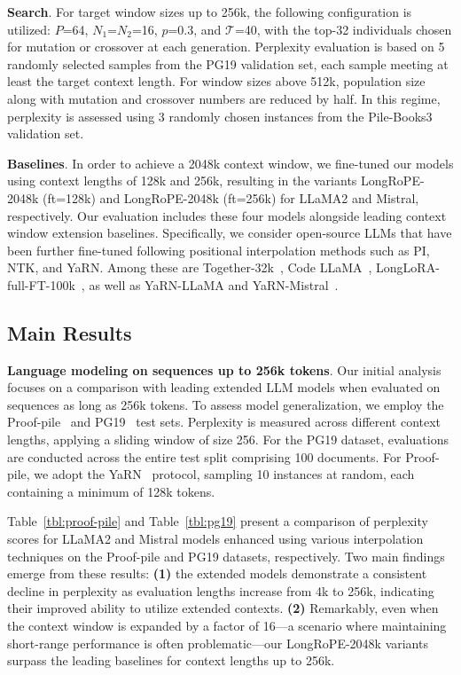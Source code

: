 \textbf{Search}. For target window sizes up to 256k, the following configuration is utilized: $P$=64, $N_1$=$N_2$=16, $p$=0.3, and $\mathcal{T}$=40, with the top-32 individuals chosen for mutation or crossover at each generation. Perplexity evaluation is based on 5 randomly selected samples from the PG19 validation set, each sample meeting at least the target context length. For window sizes above 512k, population size along with mutation and crossover numbers are reduced by half. In this regime, perplexity is assessed using 3 randomly chosen instances from the Pile-Books3~\cite{pile} validation set.

\textbf{Baselines}. In order to achieve a 2048k context window, we fine-tuned our models using context lengths of 128k and 256k, resulting in the variants LongRoPE-2048k (ft=128k) and LongRoPE-2048k (ft=256k) for LLaMA2 and Mistral, respectively. Our evaluation includes these four models alongside leading context window extension baselines. Specifically, we consider open-source LLMs that have been further fine-tuned following positional interpolation methods such as PI, NTK, and YaRN. Among these are Together-32k~\cite{together}, Code LLaMA~\cite{codellama}, LongLoRA-full-FT-100k~\cite{longlora}, as well as YaRN-LLaMA and YaRN-Mistral~\cite{yarn}.

\subsection{Main Results}

\label{sec:mainresult}
\textbf{Language modeling on sequences up to 256k tokens}. Our initial analysis focuses on a comparison with leading extended LLM models when evaluated on sequences as long as 256k tokens. To assess model generalization, we employ the Proof-pile~\cite{pg19} and PG19~\cite{pile} test sets. Perplexity is measured across different context lengths, applying a sliding window of size 256. For the PG19 dataset, evaluations are conducted across the entire test split comprising 100 documents. For Proof-pile, we adopt the YaRN~\cite{yarn} protocol, sampling 10 instances at random, each containing a minimum of 128k tokens.

Table~\ref{tbl:proof-pile} and Table~\ref{tbl:pg19} present a comparison of perplexity scores for LLaMA2 and Mistral models enhanced using various interpolation techniques on the Proof-pile and PG19 datasets, respectively. Two main findings emerge from these results: \textbf{(1)} the extended models demonstrate a consistent decline in perplexity as evaluation lengths increase from 4k to 256k, indicating their improved ability to utilize extended contexts. \textbf{(2)} Remarkably, even when the context window is expanded by a factor of 16—a scenario where maintaining short-range performance is often problematic—our LongRoPE-2048k variants surpass the leading baselines for context lengths up to 256k.

